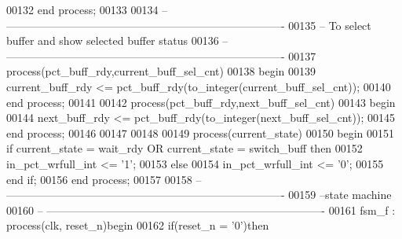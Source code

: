 \begin{DoxyCode}
00132 \textcolor{keywordflow}{end} \textcolor{keywordflow}{process};
00133 
00134 \textcolor{keyword}{-- ----------------------------------------------------------------------------}
00135 \textcolor{keyword}{-- To select buffer and show selected buffer status}
00136 \textcolor{keyword}{-- ----------------------------------------------------------------------------}
00137 \textcolor{keywordflow}{process}(pct_buff_rdy,current_buff_sel_cnt)
00138 \textcolor{vhdlkeyword}{begin}
00139    \textcolor{vhdlchar}{current_buff_rdy} \textcolor{vhdlchar}{<=} \textcolor{vhdlchar}{pct_buff_rdy}\textcolor{vhdlchar}{(}\textcolor{vhdlchar}{to\_integer}\textcolor{vhdlchar}{(}\textcolor{vhdlchar}{current_buff_sel_cnt}\textcolor{vhdlchar}{)}\textcolor{vhdlchar}{)};
00140 \textcolor{keywordflow}{end} \textcolor{keywordflow}{process};
00141 
00142 \textcolor{keywordflow}{process}(pct_buff_rdy,next_buff_sel_cnt)
00143 \textcolor{vhdlkeyword}{begin}
00144    \textcolor{vhdlchar}{next_buff_rdy} \textcolor{vhdlchar}{<=} \textcolor{vhdlchar}{pct_buff_rdy}\textcolor{vhdlchar}{(}\textcolor{vhdlchar}{to\_integer}\textcolor{vhdlchar}{(}\textcolor{vhdlchar}{next_buff_sel_cnt}\textcolor{vhdlchar}{)}\textcolor{vhdlchar}{)};
00145 \textcolor{keywordflow}{end} \textcolor{keywordflow}{process};
00146 
00147 
00148 
00149 \textcolor{keywordflow}{process}(current_state)
00150 \textcolor{vhdlkeyword}{begin}
00151    \textcolor{keywordflow}{if} \textcolor{vhdlchar}{current_state} \textcolor{vhdlchar}{=} \textcolor{vhdlchar}{wait\_rdy}  \textcolor{keywordflow}{OR} \textcolor{vhdlchar}{current_state} \textcolor{vhdlchar}{=} \textcolor{vhdlchar}{switch\_buff} \textcolor{keywordflow}{then} 
00152       \textcolor{vhdlchar}{in_pct_wrfull_int} \textcolor{vhdlchar}{<=} \textcolor{vhdlchar}{'}\textcolor{vhdllogic}{}\textcolor{vhdllogic}{1}\textcolor{vhdlchar}{'};
00153    \textcolor{keywordflow}{else}
00154       \textcolor{vhdlchar}{in_pct_wrfull_int} \textcolor{vhdlchar}{<=} \textcolor{vhdlchar}{'}\textcolor{vhdllogic}{}\textcolor{vhdllogic}{0}\textcolor{vhdlchar}{'};
00155    \textcolor{keywordflow}{end} \textcolor{keywordflow}{if};
00156 \textcolor{keywordflow}{end} \textcolor{keywordflow}{process};
00157 
00158 \textcolor{keyword}{-- ----------------------------------------------------------------------------}
00159 \textcolor{keyword}{--state machine}
00160 \textcolor{keyword}{-- ----------------------------------------------------------------------------}
00161 fsm\_f : \textcolor{keywordflow}{process}(clk, reset_n)\textcolor{keywordflow}{begin}
00162     \textcolor{keywordflow}{if}\textcolor{vhdlchar}{(}\textcolor{vhdlchar}{reset_n} \textcolor{vhdlchar}{=} \textcolor{vhdlchar}{'}\textcolor{vhdllogic}{}\textcolor{vhdllogic}{0}\textcolor{vhdlchar}{'}\textcolor{vhdlchar}{)}\textcolor{keywordflow}{then}

\end{DoxyCode}
